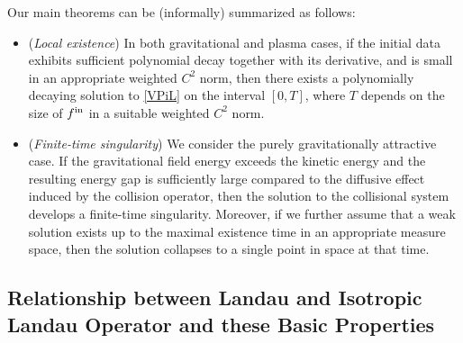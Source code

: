 \documentclass[reqno,11pt,final]{amsart}
\theoremstyle{plain}
\numberwithin{equation}{section}
\numberwithin{theorem}{section}
\begin{document}
Our main theorems can be (informally) summarized as follows:
\begin{itemize}
    \item (\textit{Local existence}) In both gravitational and plasma cases, if the initial data exhibits sufficient polynomial decay together with its derivative, and is small in an appropriate weighted $C^2$ norm, then there exists a polynomially decaying solution to \eqref{VPiL} on the interval $[0,T]$, where $T$ depends on the size of $f^\textup{in}$ in a suitable weighted $C^2$ norm.
    \item (\textit{Finite-time singularity}) We consider the purely gravitationally attractive case. If the gravitational field energy exceeds the kinetic energy and the resulting energy gap is sufficiently large compared to the diffusive effect induced by the collision operator, then the solution to the collisional system develops a finite-time singularity. Moreover, if we further assume that a weak solution exists up to the maximal existence time in an appropriate measure space, then the solution collapses to a single point in space at that time.
\end{itemize}

\subsection{Relationship between Landau and Isotropic Landau Operator and these Basic Properties}
\end{document}
